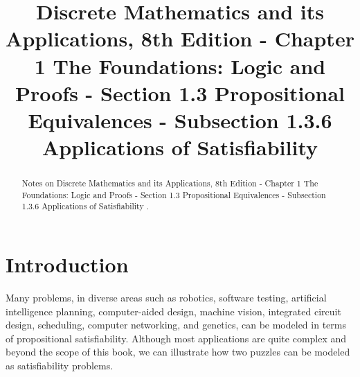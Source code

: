\documentclass{Axon}
\title{Discrete Mathematics and its Applications, 8th Edition - Chapter 1 The Foundations: Logic and Proofs - Section 1.3 Propositional Equivalences - Subsection 1.3.6 Applications of Satisfiability}
\begin{document}
\maketitle
\makeauthor
\begin{abstract}
Notes on Discrete Mathematics and its Applications, 8th Edition - Chapter 1 The Foundations: Logic and Proofs - Section 1.3 Propositional Equivalences - Subsection 1.3.6 Applications of Satisfiability \cite{Rosen}.
\end{abstract}
\section{Introduction}
Many problems, in diverse areas such as robotics, software testing, artificial intelligence planning, computer-aided design, machine vision, integrated circuit design, scheduling, computer networking, and genetics, can be modeled in terms of propositional satisfiability. Although most applications are quite complex and beyond the scope of this book, we can illustrate how two puzzles can be modeled as satisfiability problems.
\end{document}
